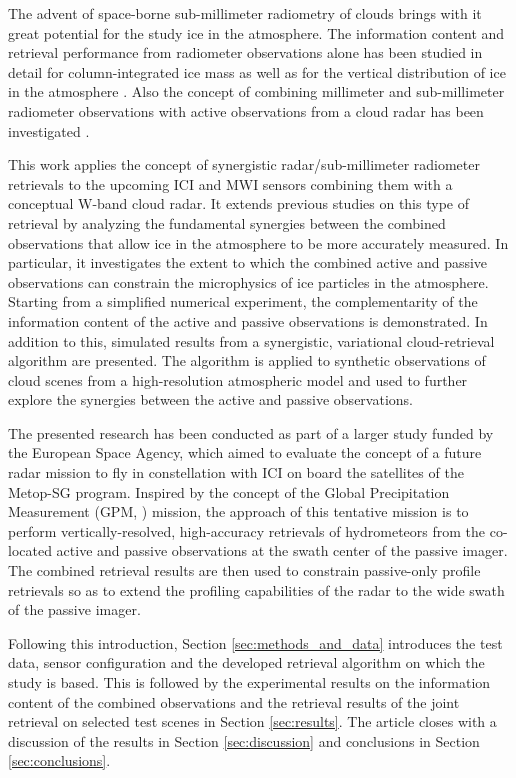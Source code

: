 \documentclass[journal abbreviation, manuscript]{copernicus}
\begin{document}
The advent of space-borne sub-millimeter radiometry of clouds brings with it
great potential for the study ice in the atmosphere. The information content and
retrieval performance from radiometer observations alone has been studied in
detail for column-integrated ice mass \citep{jimenez07, wang17, brath18a} as
well as for the vertical distribution of ice in the atmosphere \citep{birman17, grutzun18,
  aires19}. Also the concept of combining millimeter and sub-millimeter
radiometer observations with active observations from a cloud radar has been
investigated \citep{evans05, jiang19}.

This work applies the concept of synergistic radar/sub-millimeter radiometer
retrievals to the upcoming ICI and MWI sensors combining them with a conceptual
W-band cloud radar. It extends previous studies on this type of retrieval by
analyzing the fundamental synergies between the combined observations that allow
ice in the atmosphere to be more accurately measured. In particular, it
investigates the extent to which the combined active and passive observations
can constrain the microphysics of ice particles in the atmosphere. Starting from
a simplified numerical experiment, the complementarity of the information
content of the active and passive observations is demonstrated. In addition to
this, simulated results from a synergistic, variational cloud-retrieval
algorithm are presented. The algorithm is applied to synthetic observations of
cloud scenes from a high-resolution atmospheric model and used to further
explore the synergies between the active and passive observations.

The presented research has been conducted as part of a larger study funded by
the European Space Agency, which aimed to evaluate the concept of a future radar
mission to fly in constellation with ICI on board the satellites of the Metop-SG
program. Inspired by the concept of the Global Precipitation Measurement (GPM,
\cite{hou14}) mission, the approach of this tentative mission is to perform
vertically-resolved, high-accuracy retrievals of hydrometeors from the
co-located active and passive observations at the swath center of the passive
imager. The combined retrieval results are then used to constrain passive-only
profile retrievals so as to extend the profiling capabilities of the radar to
the wide swath of the passive imager.

Following this introduction, Section \ref{sec:methods_and_data} introduces the
test data, sensor configuration and the developed retrieval algorithm on which
the study is based. This is followed by the experimental results on the
information content of the combined observations and the retrieval results of
the joint retrieval on selected test scenes in Section \ref{sec:results}. The
article closes with a discussion of the results in Section \ref{sec:discussion}
and conclusions in Section \ref{sec:conclusions}.
\end{document}
